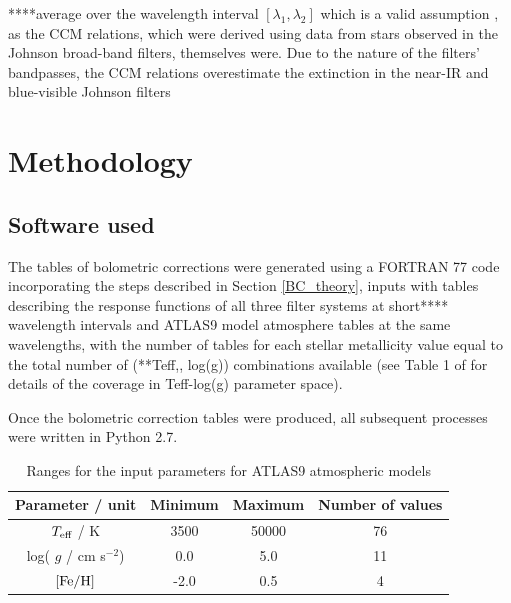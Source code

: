 \documentclass[12pt, a4paper]{report}
\begin{document}
****average over the wavelength interval $[\lambda_{1},\lambda_{2}]$ which is a valid assumption \citep{2014MNRAS.444..392C}, as the CCM relations, which were derived using data from stars observed in the Johnson broad-band filters, themselves were. Due to the nature of the filters' bandpasses, the CCM relations overestimate the extinction in the near-IR and blue-visible Johnson filters

\chapter{Methodology}
\section{Software used}
The tables of bolometric corrections were generated using a FORTRAN 77 code incorporating the steps described in Section \ref{BC_theory}, inputs with tables describing the response functions of all three filter systems at short**** wavelength intervals and ATLAS9 model atmosphere tables at the same wavelengths, with the number of tables for each stellar metallicity value equal to the total number of (**Teff,, log(g)) combinations available (see Table 1 of \cite{2004astro.ph..5087C} for details of the coverage in Teff-log(g) parameter space).

Once the bolometric correction tables were produced, all subsequent processes were written in Python 2.7.

\begin{table}
\begin{center}
\begin{tabular}{cccc}
\hline
Parameter / unit & Minimum & Maximum & Number of values \\
\hline
$T_{\textnormal{eff}}$ / K & 3500 & 50000 & 76 \\
log( $g$ / cm s$^{-2}$) & 0.0 & 5.0 & 11 \\
$\textnormal{[Fe/H]}$ & -2.0 & 0.5 & 4 \\
\hline
\end{tabular}
\caption{Ranges for the input parameters for ATLAS9 atmospheric models}
\label{atlas9_input}
\end{center}
\end{table}
\end{document}

